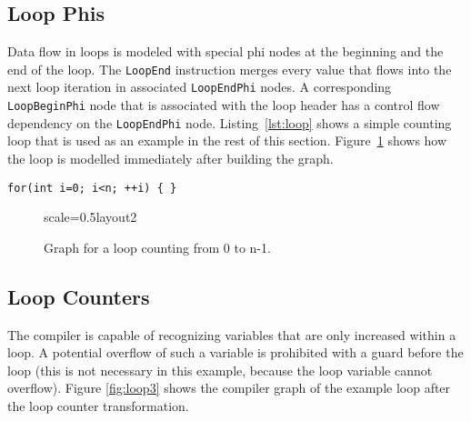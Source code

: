 \documentclass[twocolumn]{svjour3}
\newcommand\nodename[1]{\texttt{#1}}
\begin{document}
\subsection{Loop Phis}
Data flow in loops is modeled with special phi nodes at the beginning and the end of the loop.
The \nodename{LoopEnd} instruction merges every value that flows into the next loop iteration in associated \nodename{LoopEndPhi} nodes.
A corresponding \nodename{LoopBeginPhi} node that is associated with the loop header has a control flow dependency on the \nodename{LoopEndPhi} node.
Listing~\ref{lst:loop} shows a simple counting loop that is used as an example in the rest of this section.
Figure~\ref{fig:loop2} shows how the loop is modelled immediately after building the graph.

\begin{lstlisting}[label=lst:loop, caption=Loop example that counts from 0 to n-1., captionpos=b]
for(int i=0; i<n; ++i) { }
\end{lstlisting}

\begin{figure}[ht]
  \centering
\begin{digraphenv}{scale=0.5}{layout2}
\end{digraphenv}
  \caption{Graph for a loop counting from 0 to n-1.}
  \label{fig:loop2}
\end{figure}

\subsection{Loop Counters}
The compiler is capable of recognizing variables that are only increased within a loop.
A potential overflow of such a variable is prohibited with a guard before the loop (this is not necessary in this example, because the loop variable cannot overflow).
Figure \ref{fig:loop3} shows the compiler graph of the example loop after the loop counter transformation.
\end{document}

